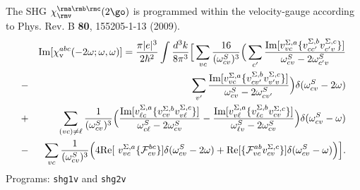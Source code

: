 \documentclass[12pt,leqno]{article}
\numberwithin{equation}{section}
\begin{document}
\begin{itemize}
\begin{itemize}
The SHG $\chi_{\rmv}^{\rma\rmb\rmc}(2\go)$ is programmed within the velocity-gauge
 according to Phys.  Rev. B {\bf 80}, 155205-1-13 (2009).
\begin{eqnarray*}
&&\mbox{Im}\lbrack \chi _{\mathrm{v}}^{abc}(-2\omega;\omega,\omega)] 
=\frac{\pi
|e|^{3}}{2\hbar ^{2}}\int \frac{d^{3}k}{8\pi ^{3}}\Big[\sum_{vc}\frac{16}{(
\omega_{cv}^{S})^{3}}\Big(\sum_{c^{\prime }}\frac{\mbox{Im}\lbrack
v_{vc}^{\Sigma ,a}\{v_{cc^{\prime }}^{\Sigma ,b}v_{c^{\prime }v}^{\Sigma
,c}\}]}{\omega_{cv}^{S}-2\omega_{c^{\prime }v}^{S}}  \notag  \label{imchicf} \\
&-&\sum_{v^{\prime }}\frac{\mbox{Im}\lbrack v_{vc}^{\Sigma
,a}\{v_{cv^{\prime }}^{\Sigma ,b}v_{v^{\prime }v}^{\Sigma ,c}\}]}{\omega
_{cv}^{S}-2\omega_{cv^{\prime }}^{S}}\Big)\delta(\omega_{cv}^{S}-2\omega)  \notag \\
&+&\sum_{(vc)\neq\ell }\frac{1}{(\omega_{cv}^{S})^{3}}\Big(\frac{\mbox{Im}\lbrack
v_{\ell c}^{\Sigma ,a}\{v_{cv}^{\Sigma ,b}v_{v\ell }^{\Sigma ,c}\}]}{\omega
_{c\ell }^{S}-2\omega_{cv}^{S}}-\frac{\mbox{Im}\lbrack v_{v\ell }^{\Sigma
,a}\{v_{\ell c}^{\Sigma ,b}v_{cv}^{\Sigma ,c}\}]}{\omega_{\ell v}^{S}-2\omega
_{cv}^{S}}\Big)\delta(\omega_{cv}^{S}-\omega)  \notag \\
&-&\sum_{vc}\frac{1}{(\omega_{cv}^{S})^{3}}\Big(4\mbox{Re}\lbrack \
v_{vc}^{\Sigma ,a}\{\mathcal{F}_{cv}^{bc}\}]\delta(\omega_{cv}^{S}-2\omega)+\mbox{Re}
\lbrack \{\mathcal{F}_{vc}^{ab}v_{cv}^{\Sigma ,c}\}]\delta(\omega_{cv}^{S}-\omega)
\Big)\Big].
\end{eqnarray*}
Programs: \verb=shg1v= and \verb=shg2v=


\end{itemize}
\end{itemize}
\end{document}
